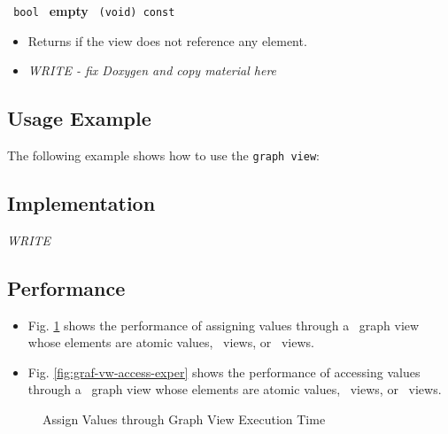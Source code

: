 \noindent
\texttt{%
bool
}
\newline
\textbf{empty}%
\texttt{%
(void) const
}

\begin{itemize}
\item
Returns if the view does not reference any element.
\end{itemize}

\begin{itemize}
\item
\textit{WRITE - fix Doxygen and copy material here}
\end{itemize}

\subsection{Usage Example} \label{sec-graf-vw-use}

The following example shows how to use the \texttt{graph view}:


\subsection{Implementation} \label{sec-graf-vw-impl}

\textit{WRITE}

\subsection{Performance} \label{sec-graf-vw-perf}

\begin{itemize}
\item
Fig. \ref{fig:graf-vw-assign-exper}
shows the performance of assigning values through a \stapl\ graph view
whose elements are atomic values, \stl\ views, or \stapl\ views.
\item
Fig. \ref{fig:graf-vw-access-exper}
shows the performance of accessing values through a \stapl\ graph view
whose elements are atomic values, \stl\ views, or \stapl\ views.
\end{itemize}

\begin{figure}[p]
\caption{Assign Values through Graph View Execution Time}
\label{fig:graf-vw-assign-exper}
\end{figure}

